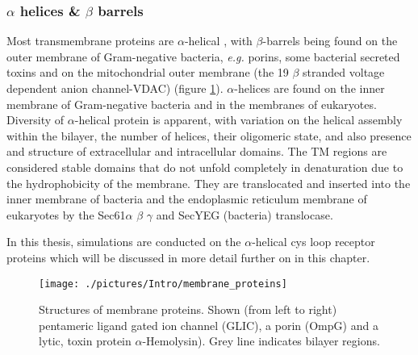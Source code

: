 \subsubsection*{$\alpha$ helices \& $\beta$ barrels}

Most transmembrane proteins are $\alpha$-helical \cite{Popot2002}, with $\beta$-barrels being found on the outer membrane of Gram-negative bacteria, \textit{e.g.} porins, some bacterial secreted toxins and on the mitochondrial outer membrane (the 19 $\beta$ stranded voltage dependent anion channel-VDAC) (figure \ref{fig:membrane_proteins}). $\alpha$-helices are found on the inner membrane of Gram-negative bacteria and in the membranes of eukaryotes. Diversity of $\alpha$-helical protein is apparent, with variation on the helical assembly within the bilayer, the number of helices, their oligomeric state, and also presence and structure of extracellular and intracellular domains. The TM regions are considered stable domains that do not unfold completely in denaturation due to the hydrophobicity of the membrane. They are translocated and inserted into the inner membrane of bacteria and the endoplasmic reticulum membrane of eukaryotes by the Sec61$\alpha$ $\beta$ $\gamma$ \cite{DuPlessis2011} and SecYEG (bacteria) translocase.

In this thesis, simulations are conducted on the $\alpha$-helical cys loop receptor proteins which will be discussed in more detail further on in this chapter. 

\begin{figure}[H]
\begin{center}
\texttt{[image: ./pictures/Intro/membrane\_proteins]}
\caption[Structures of membrane proteins.] {Structures of membrane proteins. Shown (from left to right) pentameric ligand gated ion channel (GLIC), a porin (OmpG) and a lytic, toxin protein $\alpha$-Hemolysin). Grey line indicates bilayer regions.}
\label{fig:membrane_proteins}
\end{center}
\end{figure}

